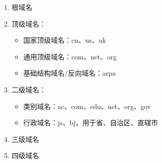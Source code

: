 \begin{enumerate}
    \item 根域名
    \item 顶级域名：\begin{itemize}
        \item 国家顶级域名：cn、us、uk
        \item 通用顶级域名：com、net、org
        \item 基础结构域名/反向域名：arpa
    \end{itemize}
    \item 二级域名：\begin{itemize}
        \item 类别域名：ac、com、edu、net、org、gov
        \item 行政域名：js、bj，用于省、自治区、直辖市
    \end{itemize}
    \item 三级域名
    \item 四级域名
\end{enumerate}


